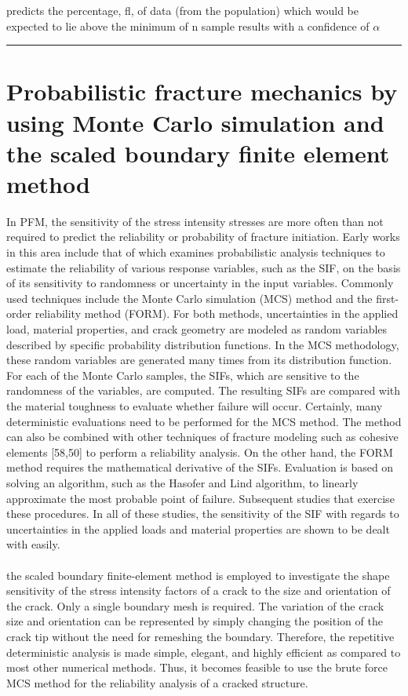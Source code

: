 \documentclass[12pt]{article}
\begin{document}
predicts the percentage, fl, of data (from the population) which would be expected to
lie above the minimum of n sample results with a confidence of $\alpha$
\\\rule{\textwidth}{.1em}
\section{Probabilistic fracture mechanics by using Monte Carlo simulation
and the scaled boundary finite element method}
In PFM, the sensitivity of the stress intensity stresses are more often than not required to predict the 
reliability or probability of fracture initiation. 
Early works in this area include that of which examines probabilistic analysis techniques to estimate the reliability
 of various response variables, such as the SIF, on the basis of its sensitivity to randomness or uncertainty in the
input variables. Commonly used techniques include the Monte Carlo simulation (MCS) method and the first-order reliability
method (FORM). For both methods, uncertainties in the applied load, material properties, and crack geometry are modeled
as random variables described by specific probability distribution functions. In the MCS methodology, these random
variables are generated many times from its distribution function. For each of the Monte Carlo samples, the SIFs, which
are sensitive to the randomness of the variables, are computed. The resulting SIFs are compared with the material toughness
to evaluate whether failure will occur. Certainly, many deterministic evaluations need to be performed for the MCS method.
The method can also be combined with other techniques of fracture modeling such as cohesive elements [58,50] to perform a
reliability analysis. On the other hand, the FORM method requires the mathematical derivative of the SIFs. Evaluation is
based on solving an algorithm, such as the Hasofer and Lind algorithm, to linearly approximate the most probable point
of failure. Subsequent studies that exercise these procedures. In all of these
studies, the sensitivity of the SIF with regards to uncertainties in the applied loads and material properties are shown to be
dealt with easily.\\\\the scaled boundary finite-element method is employed to investigate the shape sensitivity of the stress
intensity factors of a crack to the size and orientation of the crack. Only a single boundary mesh is required. The variation
of the crack size and orientation can be represented by simply changing the position of the crack tip without the need for
remeshing the boundary. Therefore, the repetitive deterministic analysis is made simple, elegant, and highly efficient as
compared to most other numerical methods. Thus, it becomes feasible to use the brute force MCS method for the reliability
analysis of a cracked structure.
\end{document}
